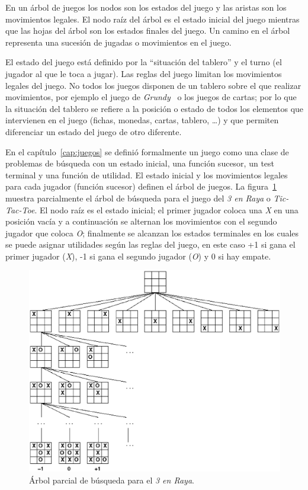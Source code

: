 En un árbol de juegos los nodos son los estados del juego y las aristas son los movimientos legales.
El nodo raíz del árbol es el estado inicial del juego mientras que las hojas del árbol son los estados finales del juego. 
Un camino en el árbol representa una sucesión de jugadas o movimientos en el juego.

El estado del juego está definido por la ``situación del tablero'' y el turno (el jugador al que le toca a jugar). 
Las reglas del juego limitan los movimientos legales del juego.
No todos los juegos disponen de un tablero sobre el que realizar movimientos, por ejemplo el juego de \textit{Grundy}~ o los juegos de cartas; por lo que la situación del tablero se refiere a la posición o estado de todos los elementos que intervienen en el juego (fichas, monedas, cartas, tablero, \ldots) y que permiten diferenciar un estado del juego de otro diferente.

En el capítulo~\ref{cap:juegos} se definió formalmente un juego como una clase de problemas de búsqueda con un estado inicial, una función sucesor, un test terminal y una función de utilidad.
El estado inicial y los movimientos legales para cada jugador (función sucesor) definen el árbol de juegos.
La figura~\ref{fig:arbol_juego_3enraya} muestra parcialmente el árbol de búsqueda para el juego del \textit{3 en Raya} o \textit{Tic-Tac-Toe}.
El nodo raíz es el estado inicial; el primer jugador coloca una \textit{X} en una posición vacía y a continuación se alternan los movimientos con el segundo jugador que coloca \textit{O}; finalmente se alcanzan los estados terminales en los cuales se puede asignar utilidades según las reglas del juego, en este caso +1 si gana el primer jugador (\textit{X}), -1 si gana el segundo jugador (\textit{O}) y 0 si hay empate.
\begin{figure}[h]
	\centering
	\includegraphics[scale=0.5]{contenido/cap3/imagenes/game_tree.eps}
	\caption{Árbol parcial de búsqueda para el \textit{3 en Raya}.}
	\label{fig:arbol_juego_3enraya}
\end{figure}


